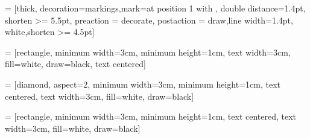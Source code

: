 
\usetikzlibrary{shapes.geometric, arrows, decorations.markings, positioning}

 = [thick, decoration={markings,mark=at position
  1 with {}},
double distance=1.4pt, shorten >= 5.5pt,
preaction = {decorate},
postaction = {draw,line width=1.4pt, white,shorten >= 4.5pt}]

 = [rectangle, minimum width=3cm, minimum height=1cm,
text width=3cm,
fill=white,
draw=black,
text centered]

 = [diamond, aspect=2, minimum width=3cm, minimum
height=1cm,
text centered,
text width=3cm,
fill=white,
draw=black]

 = [rectangle, minimum width=3cm, minimum height=1cm,
text centered,
text width=3cm,
fill=white,
draw=black]




